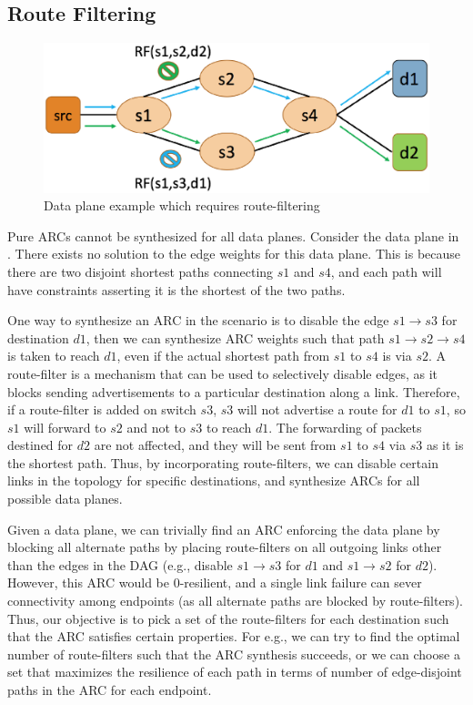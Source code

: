 \subsection{Route Filtering} \label{sec:routefilter}
\begin{figure}[h!] 
	\centering
	\includegraphics[width=0.8\columnwidth]{figures/diamond.eps}
	\caption{Data plane example which requires route-filtering} \label{fig:diamond}
\end{figure}
Pure ARCs cannot be synthesized for all data planes. Consider the data
plane in . 
There exists no solution to the edge weights for this data plane. 
This is because 
there are two disjoint shortest paths connecting 
$s1$ and $s4$, and each path will have 
constraints
asserting it is the shortest of the two paths. 

One way to synthesize an ARC in the scenario 
is to disable the edge
$s1 \rightarrow s3$ for destination $d1$, 
then we can synthesize ARC weights
such that path $s1 \rightarrow s2 \rightarrow s4$
 is taken to reach $d1$, 
even if the actual shortest path
from $s1$ to $s4$ is via $s2$. 
A route-filter is a mechanism 
that can be used to selectively disable
edges, as it blocks sending advertisements to a
particular destination along a link. 
Therefore, if a route-filter is added on switch $s3$, 
$s3$ 
will not advertise a route for $d1$ to $s1$, so 
$s1$ will forward to $s2$ and not to $s3$
to reach $d1$. The forwarding of packets destined
for $d2$ are not affected, and they will be sent from
$s1$ to $s4$ via $s3$ as it is the shortest path.
Thus, by incorporating route-filters, we can
disable certain links in the topology 
for specific destinations, and synthesize
ARCs for all possible data planes. 

Given a data plane, we can trivially find an 
ARC enforcing the data plane by blocking all alternate
paths by placing 
route-filters on all outgoing links other than the edges
in the DAG (e.g., disable $s1 \rightarrow s3$ for $d1$
and $s1 \rightarrow s2$ for $d2$). However, this 
ARC would be
0-resilient, and a single link failure can sever 
connectivity among endpoints (as all alternate paths
are blocked by route-filters). Thus, our objective is
to pick a set of the route-filters for each destination
such that the 
ARC satisfies certain properties. For e.g., we can
try to find the optimal number of route-filters such 
that the ARC synthesis succeeds, or we can choose a
set that maximizes the resilience of each path 
in terms of number of edge-disjoint paths in the ARC
for each endpoint. 

